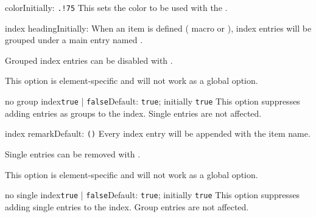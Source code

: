 \documentclass[11pt, outputdir = ./out]{article}
\begin{document}
\begin{Optiondef}{color}{}{Initially: \texttt{.!75}}
    This sets the color to be used with the .
\end{Optiondef}

\begin{Optiondef}{index heading}{}{Initially: }
    When an item is defined ( macro or \hyperref[environmentdef]{}), index entries will be grouped under a main entry named .

    Grouped index entries can be disabled with .

    This option is element-specific and will not work as a global option.
\end{Optiondef}

\begin{Optiondef}{no group index}{\texttt{true} | \texttt{false}}{Default: \texttt{true}; initially \texttt{true}}
    This option suppresses adding entries as groups to the index. Single entries are not affected. 
\end{Optiondef}

\begin{Optiondef}{index remark}{}{Default: \texttt{\DocsTilde()}}
    Every index entry will be appended with  the item name.

    Single entries can be removed with .

    This option is element-specific and will not work as a global option.
\end{Optiondef}

\begin{Optiondef}{no single index}{\texttt{true} | \texttt{false}}{Default: \texttt{true}; initially \texttt{true}}
    This option suppresses adding single entries to the index. Group entries are not affected.
\end{Optiondef}


\begin{Optiondef}{}{}{}
\end{Optiondef}

\begin{Optiondef}{}{}{}
\end{Optiondef}

\begin{Optiondef}{}{}{}
\end{Optiondef}
\end{document}
